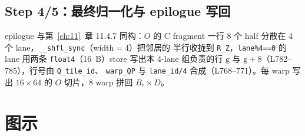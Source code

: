 \subsection{Step 4/5：最终归一化与 epilogue 写回}





epilogue 与第~\ref{ch:11}~章 11.4.7 同构：$O$ 的 C fragment 一行 8 个
half 分散在 4 个 lane，\texttt{\_\_shfl\_sync}（width$=$4）把邻居的
半行收拢到 \texttt{R\_Z}，\texttt{lane\%4==0} 的 lane 用两条
\texttt{float4}（16~B）store 写出本 4-lane 组负责的行 $\mathrm{g}$ 与
$\mathrm{g}{+}8$（L782--785），行号由 \texttt{Q\_tile\_id}、
\texttt{warp\_QP} 与 \texttt{lane\_id/4} 合成（L768--771）。每 warp
写出 $16\times64$ 的 $O$ 切片，8 warp 拼回 $B_r\times D$。

\needspace{181mm}

\section{图示}


